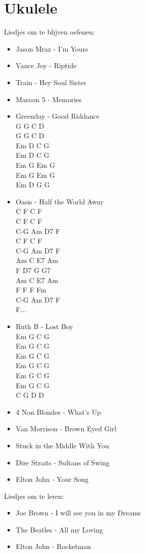 \documentclass{article}
\begin{document}
\section{Ukulele}
Liedjes om te blijven oefenen:
\begin{itemize}
    \item Jason Mraz - I'm Yours
    \item Vance Joy - Riptide
    \item Train - Hey Soul Sister
    \item Maroon 5 - Memories
    \item Greenday - Good Riddance
    \\ G G C D \\ G G C D \\ Em D C G \\ Em D C G \\ Em G Em G \\ Em G Em G \\ Em D G G 
    \item Oasis - Half the World Away
    \\ C F C F \\ C F C F \\ C-G Am D7 F \\ C F C F \\ C-G Am D7 F \\ Am C E7 Am \\  F D7 G G7 \\ Am C E7 Am \\ F F F Fm \\ C-G Am D7 F \\ F...
    \item Ruth B - Lost Boy
    \\ Em G C G \\ Em G C G \\ Em G C G \\ Em G C G \\ Em G C G \\ Em G C G \\ C G D D
    \item 4 Non Blondes - What's Up
    \item Van Morrison - Brown Eyed Girl
    \item Stuck in the Middle With You
    \item Dire Straits - Sultans of Swing
    \item Elton John - Your Song 
\end{itemize}
\noindent
Liedjes om te leren:
\begin{itemize}
    \item Joe Brown - I will see you in my Dreams
    \item The Beatles - All my Loving 
    \item Elton John - Rocketman
\end{itemize}
\end{document}
